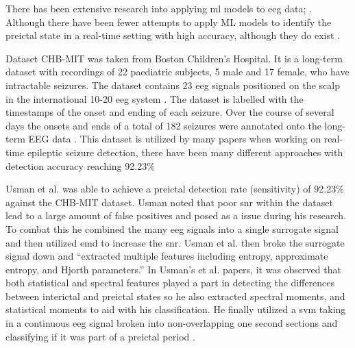 \documentclass[12pt]{article}
\begin{document}
There has been extensive research into applying \acrshort{ml} models to \acrshort{eeg} data; \cite{shoeb2010application} \cite{chakraborti2018machine}\cite{kumar2014machine} \cite{shen2022eeg} \cite{gupta2019epileptic} \cite{samiee2015long} \cite{zabihi2015analysis} \cite{wang2021one} \cite{zarei2021automatic} \cite{li2021seizure} \cite{shoeb2009application} \cite{wong2023eeg}. \\ Although there have been fewer attempts to apply ML models to identify the preictal state in a real-time setting with high accuracy, although they do exist \cite{usman2017epileptic}. 

Dataset CHB-MIT \cite{shoeb2009application} \cite{PhysioNet} was taken from Boston Children's Hospital. It is a long-term dataset with recordings of 22 paediatric subjects, 5 male and 17 female, who have intractable seizures. The dataset contains 23 \acrshort{eeg} signals positioned on the scalp in the international 10-20 \acrshort{eeg} system \cite{sharbrough1991american}. The dataset is labelled with the timestamps of the onset and ending of each seizure. Over the course of several days the onsets and ends of a total of 182 seizures were annotated onto the long-term EEG data \cite{shoeb2009application} \cite{PhysioNet}. This dataset is utilized by many papers when working on real-time epileptic seizure detection, there have been many different approaches with detection accuracy reaching 92.23\% \cite{usman2017epileptic}


Usman et al. was able to achieve a preictal detection rate (sensitivity) of 92.23\% against the CHB-MIT dataset. \cite{usman2017epileptic} Usman noted that poor \acrfull{snr} within the dataset lead to a large amount of false positives and posed as a issue during his research. To combat this he combined the many \acrshort{eeg} signals into a single surrogate signal and then utilized \acrfull{emd} to increase the \acrshort{snr}. Usman et al. then broke the surrogate signal down and ``extracted multiple features including entropy, approximate entropy, and Hjorth parameters.'' In Usman's et al. papers, it was observed that both statistical and spectral features played a part in detecting the differences between interictal and preictal states so he also extracted spectral moments, and statistical moments to aid with his classification. He finally utilized a \acrfull{svm} taking in a continuous \acrshort{eeg} signal broken into non-overlapping one second sections and classifying if it was part of a preictal period \cite{usman2017epileptic}.
\end{document}
